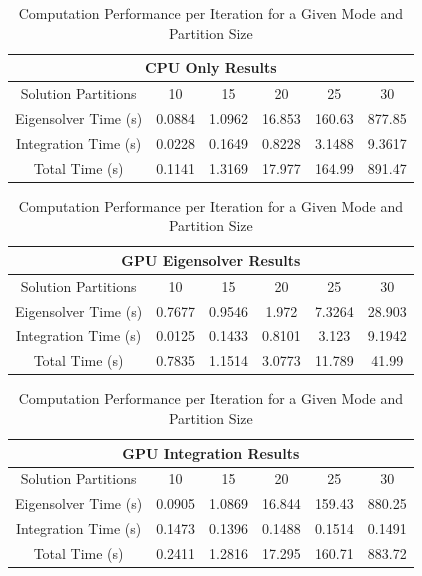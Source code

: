 \documentclass[conference, twoside]{IEEEtran}
\begin{document}
\begin{table}
    \renewcommand{\arraystretch}{1.3} %
    \caption{Computation Performance per Iteration for a Given Mode and Partition Size}
    \label{numeric-results}
    \centering
    \begin{tabular}{|c||c|c|c|c|c|}
        \multicolumn{6}{c}{CPU Only Results} \\
        \hline
        {Solution Partitions} & {10} & {15} & {20} & {25} & {30} \\
        \hline
        \hline
        {Eigensolver Time (s)}              & {0.0884} & {1.0962} & {16.853} & {160.63} & {877.85}\\
        {Integration Time (s)}              & {0.0228} & {0.1649} & {0.8228} & {3.1488} & {9.3617}\\
        {Total Time (s)}                    & {0.1141} & {1.3169} & {17.977} & {164.99} & {891.47}\\
        \hline
    \end{tabular}
    \begin{tabular}{|c||c|c|c|c|c|}
        \multicolumn{6}{c}{GPU Eigensolver Results} \\
        \hline
        {Solution Partitions} & {10} & {15} & {20} & {25} & {30} \\
        \hline
        \hline
        {Eigensolver Time (s)}              & {0.7677} & {0.9546} & {1.972}  & {7.3264} & {28.903}\\
        {Integration Time (s)}              & {0.0125} & {0.1433} & {0.8101} & {3.123}  & {9.1942}\\
        {Total Time (s)}                    & {0.7835} & {1.1514} & {3.0773} & {11.789} & {41.99} \\
        \hline
    \end{tabular}
    \begin{tabular}{|c||c|c|c|c|c|}
        \multicolumn{6}{c}{GPU Integration Results} \\
        \hline
        {Solution Partitions} & {10} & {15} & {20} & {25} & {30} \\
        \hline
        \hline
        {Eigensolver Time (s)}              & {0.0905} & {1.0869} & {16.844} & {159.43} & {880.25}\\
        {Integration Time (s)}              & {0.1473} & {0.1396} & {0.1488} & {0.1514} & {0.1491}\\
        {Total Time (s)}                    & {0.2411} & {1.2816} & {17.295} & {160.71} & {883.72}\\

\end{tabular}
\end{table}
\end{document}
